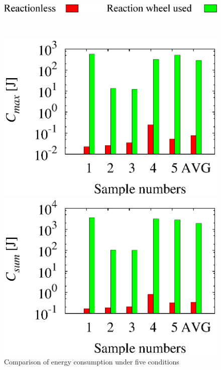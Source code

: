 \begin{figure}[t]
  \centering
  \begin{minipage}[t]{0.47\linewidth}
    \centering
    \includegraphics[width=1.0\linewidth]{fig/chapter5/comparison/comp.eps}
  \end{minipage}\\
  \vspace{-2mm}
  \begin{minipage}[t]{0.45\linewidth}
    \centering
    \includegraphics[width=1.0\linewidth]{fig/chapter5/comparison/01_maximum.eps}
  \end{minipage}
  \hspace{-4mm}
  \begin{minipage}[t]{0.45\linewidth}
    \centering
    \includegraphics[width=1.0\linewidth]{fig/chapter5/comparison/02_integral.eps}
  \end{minipage}
  \caption{Comparison of energy consumption under five conditions}
  \label{fig:RES_ENE_COMP}
\end{figure}
%


